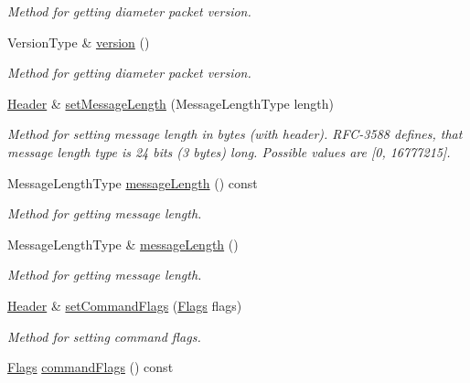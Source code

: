 \begin{DoxyCompactItemize}
\begin{DoxyCompactList}\small\item\em Method for getting diameter packet version. \end{DoxyCompactList}\item 
Version\+Type \& \hyperlink{classDiameter_1_1Packet_1_1Header_aa1cb9b6dfa3b802fe3f0df1bfc938c1d}{version} ()
\begin{DoxyCompactList}\small\item\em Method for getting diameter packet version. \end{DoxyCompactList}\item 
\hyperlink{classDiameter_1_1Packet_1_1Header}{Header} \& \hyperlink{classDiameter_1_1Packet_1_1Header_adb3f6fe659428c7054218fdbb49b1850}{set\+Message\+Length} (Message\+Length\+Type length)
\begin{DoxyCompactList}\small\item\em Method for setting message length in bytes (with header). R\+F\+C-\/3588 defines, that message length type is 24 bits (3 bytes) long. Possible values are \mbox{[}0, 16777215\mbox{]}. \end{DoxyCompactList}\item 
Message\+Length\+Type \hyperlink{classDiameter_1_1Packet_1_1Header_a0f15bcdf82cbb4adeb9570d83096249f}{message\+Length} () const
\begin{DoxyCompactList}\small\item\em Method for getting message length. \end{DoxyCompactList}\item 
Message\+Length\+Type \& \hyperlink{classDiameter_1_1Packet_1_1Header_a8dc2638edf5d090396a73fd34782e3ff}{message\+Length} ()
\begin{DoxyCompactList}\small\item\em Method for getting message length. \end{DoxyCompactList}\item 
\hyperlink{classDiameter_1_1Packet_1_1Header}{Header} \& \hyperlink{classDiameter_1_1Packet_1_1Header_aaf3efbe6f1b797d64ae79f9f9f6637f4}{set\+Command\+Flags} (\hyperlink{classDiameter_1_1Packet_1_1Header_1_1Flags}{Flags} flags)
\begin{DoxyCompactList}\small\item\em Method for setting command flags. \end{DoxyCompactList}\item 
\hyperlink{classDiameter_1_1Packet_1_1Header_1_1Flags}{Flags} \hyperlink{classDiameter_1_1Packet_1_1Header_a35c3ef1bcffaa089d797e706b2502221}{command\+Flags} () const

\end{DoxyCompactItemize}
